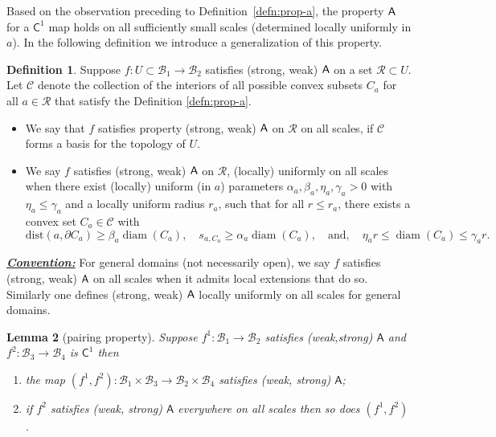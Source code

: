 \documentclass[a4, 12pt,leqno]{amsart}
\theoremstyle{plain}
\newtheorem{lemma}{Lemma}[section]
\theoremstyle{definition}
\newtheorem{definition}[lemma]{Definition}
\theoremstyle{remark}
\numberwithin{equation}{section}
\newcommand{\B}{\mathcal{B}}
\DeclareMathOperator{\diam}{diam}		%
\begin{document}
\par Based on the observation preceding to Definition~\ref{defn:prop-a}, the property ${\sf A}$ for a $\mathsf{C}^1$ map holds on all sufficiently small scales (determined locally uniformly in $a$). In the following definition we introduce a generalization of this property.
\begin{definition}
	Suppose $f: U \subset \B_1 \to \B_2$ satisfies (strong, weak) ${\sf A}$ on a set $\mathcal{R}\subset U$. Let $\mathscr{C}$ denote the collection of the interiors of all possible convex subsets $C_a$ for all $a\in \mathcal{R}$ that satisfy the Definition \ref{defn:prop-a}. 
\begin{itemize}
\item We say that $f$ satisfies property (strong, weak) ${\sf A}$ on $\mathcal{R}$ on all scales, if $\mathscr{C}$ forms a basis for the topology of $U$. 
\item We say $f$ satisfies (strong, weak) ${\sf A}$ on $\mathcal{R}$, (locally) uniformly on all scales when there exist (locally) uniform (in $a$) parameters $\alpha_a,\beta_a, \eta_a,\gamma_a >0$ with $\eta_a \le \gamma_a$ and a locally uniform radius $r_a$, such that for all $r\le r_a$, there exists a convex set $C_a \in \mathscr{C}$ with
\[
\mathrm{dist}(a,\partial C_a) \ge \beta_a \diam(C_a), \quad s_{a,C_a} \ge \alpha_a \diam(C_a), \quad \text{and}, \quad  \eta_ar \le \diam(C_a) \le \gamma_ar.
\]
\end{itemize}
\noindent\underline{\small \emph{\textbf{Convention:}}} For general domains (not necessarily open), we say $f$ satisfies (strong, weak) ${\sf A}$ on all scales when it admits local extensions that do so. Similarly one defines (strong, weak) ${\sf A}$ locally uniformly on all scales for general domains. 
\end{definition}

\begin{lemma}[pairing property]\label{lem:pair}
	Suppose $f^1: \B_1 \to \B_2$ satisfies (weak,strong) $\textsf{A}$ and $f^2: \B_3 \to \B_4$ is $\mathsf{C}^1$  then 
\begin{enumerate}
\item the map $(f^1,f^2): \B_1\times \B_3 \to \B_2 \times \B_4$ satisfies (weak, strong)  $\textsf{A}$;
\item if $f^2$ satisfies (weak, strong)  $\textsf{A}$ everywhere on all scales then so does $(f^1,f^2)$. 
\end{enumerate} 
\end{lemma}
\end{document}
